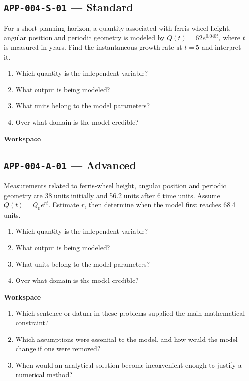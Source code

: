 \documentclass[11pt]{book}
\newcommand{\pid}[1]{\texttt{#1}}
\newcommand{\workspace}{\par\vspace{0.7in}\hrulefill\par\vspace{0.55in}\hrulefill\par}
\begin{document}
\subsection*{\pid{APP-004-S-01} — Standard}
\begin{problembox}
For a short planning horizon, a quantity associated with ferris-wheel height, angular position and periodic geometry is modeled by $Q(t)=62e^{0.040t}$, where $t$ is measured in years. Find the instantaneous growth rate at $t=5$ and interpret it.
\end{problembox}
\begin{promptbox}\begin{enumerate}
\item Which quantity is the independent variable?
\item What output is being modeled?
\item What units belong to the model parameters?
\item Over what domain is the model credible?
\end{enumerate}\end{promptbox}
\textbf{Workspace}\workspace
{}
\subsection*{\pid{APP-004-A-01} — Advanced}
\begin{problembox}
Measurements related to ferris-wheel height, angular position and periodic geometry are 38 units initially and 56.2 units after 6 time units. Assume $Q(t)=Q_0e^{rt}$. Estimate $r$, then determine when the model first reaches 68.4 units.
\end{problembox}
\begin{promptbox}\begin{enumerate}
\item Which quantity is the independent variable?
\item What output is being modeled?
\item What units belong to the model parameters?
\item Over what domain is the model credible?
\end{enumerate}\end{promptbox}
\textbf{Workspace}\workspace
\begin{reflectionbox}\begin{enumerate}
\item Which sentence or datum in these problems supplied the main mathematical constraint?
\item Which assumptions were essential to the model, and how would the model change if one were removed?
\item When would an analytical solution become inconvenient enough to justify a numerical method?
\end{enumerate}\end{reflectionbox}
\end{document}
